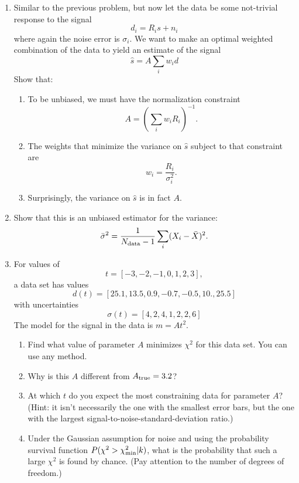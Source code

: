 \begin{enumerate}
\item  \label{ex:minvar_response} Similar to the previous problem, but now let the data be some not-trivial response to the signal
  \begin{equation*}
    d_i = R_i s + n_i
  \end{equation*}
  where again the noise error is $\sigma_i$.
  We want to make an optimal weighted combination of the data to yield an estimate of the signal
 \begin{equation*}
    \hat s = A {\sum_i w_i d}
 \end{equation*}
 Show that:
 \begin{enumerate}
 \item To be unbiased, we must have the normalization constraint
  \begin{equation*}
  A = \left(\sum_i w_i R_i \right)^{-1}.
 \end{equation*}
 \item The weights that minimize the variance on $\hat s$ subject to that constraint are
  \begin{equation*}
    w_i = \frac{R_i}{\sigma_i^2}.
  \end{equation*}
 \item Surprisingly, the variance on $\hat s$ is in fact $A$.
 \end{enumerate}


\item Show that this is an unbiased estimator for the variance:
  \begin{equation*}
    \bar \sigma^2 = \frac{1}{N_{\rm data}-1} \sum_i (X_i - \bar X)^2.
  \end{equation*}

 
\item \label{ex:chi2_data} For values of
  \begin{equation*}
      t = [-3,-2,-1,0,1,2,3],
  \end{equation*}
  a data set has values
  \begin{equation*}
    d(t) = [25.1, 13.5,  0.9, -0.7, -0.5, 10.,  25.5]
  \end{equation*}
  with uncertainties
  \begin{equation*}
    \sigma(t) = [4, 2, 4 ,1, 2, 2, 6]
  \end{equation*}
  The model for the signal in the data is $m = A t^2$.
  \begin{enumerate}
  \item Find what value of parameter $A$ minimizes $\chi^2$ for this data set.  You can use any method. 
  \item Why is this $A$ different from $A_{\rm true} = 3.2$?
  \item At which $t$ do you expect the most constraining data for parameter $A$?  (Hint: it isn't necessarily the one with the smallest error bars, but the one with the largest signal-to-noise-standard-deviation ratio.)
  \item Under the Gaussian assumption for noise and using the probability survival function $P(\chi^2 > \chi^2_{\rm min}| k)$, what is the probability that such a large $\chi^2$ is found by chance. (Pay attention to the number of degrees of freedom.)
  \end{enumerate}


\end{enumerate}
